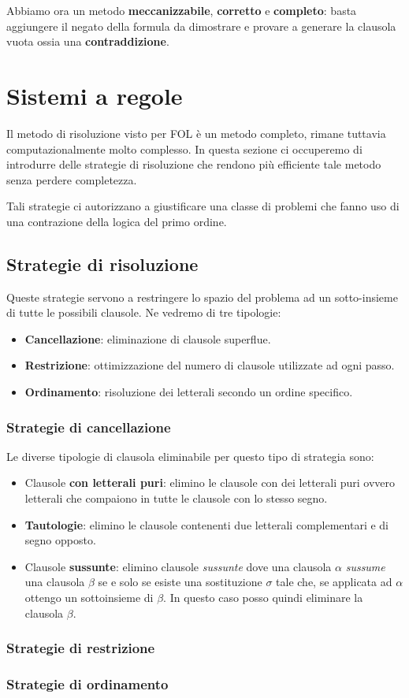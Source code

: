 Abbiamo ora un metodo \textbf{meccanizzabile}, \textbf{corretto} e \textbf{completo}: basta aggiungere il negato
della formula da dimostrare e provare a generare la clausola vuota ossia una \textbf{contraddizione}.

\section{Sistemi a regole}
Il metodo di risoluzione visto per FOL \`e un metodo completo, rimane tuttavia computazionalmente molto
complesso. In questa sezione ci occuperemo di introdurre delle strategie di risoluzione che rendono pi\`u
efficiente tale metodo senza perdere completezza.

Tali strategie ci autorizzano a giustificare una classe di problemi che fanno uso di una contrazione della
logica del primo ordine.

\subsection{Strategie di risoluzione}
Queste strategie servono a restringere lo spazio del problema ad un sotto-insieme di tutte le possibili
clausole. Ne vedremo di tre tipologie:
\begin{itemize}
	\item \textbf{Cancellazione}: eliminazione di clausole superflue.
	\item \textbf{Restrizione}: ottimizzazione del numero di clausole utilizzate ad ogni passo.
	\item \textbf{Ordinamento}: risoluzione dei letterali secondo un ordine specifico.
\end{itemize}

\subsubsection{Strategie di cancellazione}
Le diverse tipologie di clausola eliminabile per questo tipo di strategia sono:
\begin{itemize}
	\item Clausole \textbf{con letterali puri}: elimino le clausole con dei letterali puri ovvero letterali
	      che compaiono in tutte le clausole con lo stesso segno.
	\item \textbf{Tautologie}: elimino le clausole contenenti due letterali complementari e di segno opposto.
	\item Clausole \textbf{sussunte}: elimino clausole \emph{sussunte} dove una clausola $\alpha$
	      \emph{sussume} una clausola $\beta$ se e solo se esiste una sostituzione $\sigma$ tale che, se
	      applicata ad $\alpha$ ottengo un sottoinsieme di $\beta$. In questo caso posso quindi eliminare la
	      clausola $\beta$.
\end{itemize}

\subsubsection{Strategie di restrizione}


\subsubsection{Strategie di ordinamento}